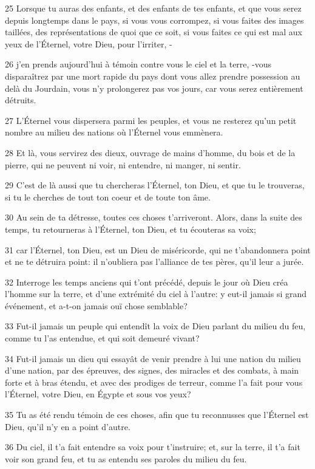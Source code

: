 \par 25 Lorsque tu auras des enfants, et des enfants de tes enfants, et que vous serez depuis longtemps dans le pays, si vous vous corrompez, si vous faites des images taillées, des représentations de quoi que ce soit, si vous faites ce qui est mal aux yeux de l'Éternel, votre Dieu, pour l'irriter, -
\par 26 j'en prends aujourd'hui à témoin contre vous le ciel et la terre, -vous disparaîtrez par une mort rapide du pays dont vous allez prendre possession au delà du Jourdain, vous n'y prolongerez pas vos jours, car vous serez entièrement détruits.
\par 27 L'Éternel vous dispersera parmi les peuples, et vous ne resterez qu'un petit nombre au milieu des nations où l'Éternel vous emmènera.
\par 28 Et là, vous servirez des dieux, ouvrage de mains d'homme, du bois et de la pierre, qui ne peuvent ni voir, ni entendre, ni manger, ni sentir.
\par 29 C'est de là aussi que tu chercheras l'Éternel, ton Dieu, et que tu le trouveras, si tu le cherches de tout ton coeur et de toute ton âme.
\par 30 Au sein de ta détresse, toutes ces choses t'arriveront. Alors, dans la suite des temps, tu retourneras à l'Éternel, ton Dieu, et tu écouteras sa voix;
\par 31 car l'Éternel, ton Dieu, est un Dieu de miséricorde, qui ne t'abandonnera point et ne te détruira point: il n'oubliera pas l'alliance de tes pères, qu'il leur a jurée.
\par 32 Interroge les temps anciens qui t'ont précédé, depuis le jour où Dieu créa l'homme sur la terre, et d'une extrémité du ciel à l'autre: y eut-il jamais si grand événement, et a-t-on jamais ouï chose semblable?
\par 33 Fut-il jamais un peuple qui entendît la voix de Dieu parlant du milieu du feu, comme tu l'as entendue, et qui soit demeuré vivant?
\par 34 Fut-il jamais un dieu qui essayât de venir prendre à lui une nation du milieu d'une nation, par des épreuves, des signes, des miracles et des combats, à main forte et à bras étendu, et avec des prodiges de terreur, comme l'a fait pour vous l'Éternel, votre Dieu, en Égypte et sous vos yeux?
\par 35 Tu as été rendu témoin de ces choses, afin que tu reconnusses que l'Éternel est Dieu, qu'il n'y en a point d'autre.
\par 36 Du ciel, il t'a fait entendre sa voix pour t'instruire; et, sur la terre, il t'a fait voir son grand feu, et tu as entendu ses paroles du milieu du feu.
